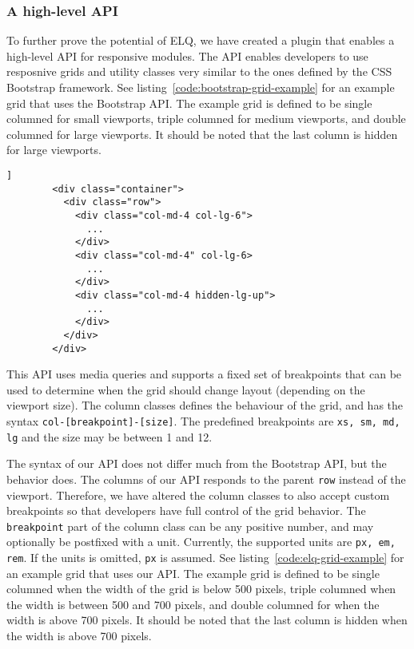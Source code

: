 \documentclass{acm_proc_article-sp}
\newcommand{\code}[1]{\texttt{#1}}
\newcommand{\elq}{ELQ}
\begin{document}
    \subsubsection{A high-level API}
      To further prove the potential of \elq{}, we have created a plugin that enables a high-level API for responsive modules.
      The API enables developers to use resposnive grids and utility classes very similar to the ones defined by the CSS Bootstrap framework.
      See listing~\ref{code:bootstrap-grid-example} for an example grid that uses the Bootstrap API.
      The example grid is defined to be single columned for small viewports, triple columned for medium viewports, and double columned for large viewports.
      It should be noted that the last column is hidden for large viewports.

      \begin{lstlisting}[gobble=8,caption={},captionpos=b,label={code:bootstrap-grid-example}]]
        <div class="container">
          <div class="row">
            <div class="col-md-4 col-lg-6">
              ...
            </div>
            <div class="col-md-4" col-lg-6>
              ...
            </div>
            <div class="col-md-4 hidden-lg-up">
              ...
            </div>
          </div>
        </div>
      \end{lstlisting}
      
      This API uses media queries and supports a fixed set of breakpoints that can be used to determine when the grid should change layout (depending on the viewport size).
      The column classes defines the behaviour of the grid, and has the syntax \code{col-[breakpoint]-[size]}.
      The predefined breakpoints are \code{xs, sm, md, lg} and the size may be between 1 and 12.

      The syntax of our API does not differ much from the Bootstrap API, but the behavior does.
      The columns of our API responds to the parent \code{row} instead of the viewport.
      Therefore, we have altered the column classes to also accept custom breakpoints so that developers have full control of the grid behavior.
      The \code{breakpoint} part of the column class can be any positive number, and may optionally be postfixed with a unit.
      Currently, the supported units are \code{px, em, rem}.
      If the units is omitted, \code{px} is assumed.
      See listing~\ref{code:elq-grid-example} for an example grid that uses our API.
      The example grid is defined to be single columned when the width of the grid is below 500 pixels, triple columned when the width is between 500 and 700 pixels, and double columned for when the width is above 700 pixels.
      It should be noted that the last column is hidden when the width is above 700 pixels.
\end{document}
